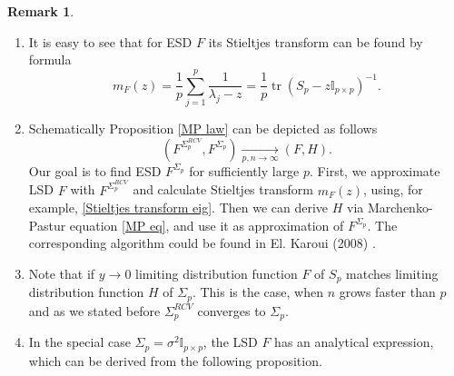 \documentclass[a4paper,11pt]{book}
\theoremstyle{plain}
\theoremstyle{definition}
\newtheorem{rmrk}[thm]{Remark}
\newcommand{\tr}{\operatorname{tr}}
\begin{document}
	\begin{rmrk} \
		\begin{enumerate}
			\item It is easy to see that for ESD $F$ its Stieltjes transform can be found by formula
			\begin{equation} \label{Stieltjes transform eig}
			m_F(z) = \frac{1}{p} \sum_{j=1}^p \frac{1}{\lambda_j - z} = \frac{1}{p} \tr(S_p-z\mathbb{I}_{p \times p})^{-1}.
			\end{equation}
			\item Schematically Proposition \ref{MP law} can be depicted as follows
			\[(F^{\Sigma_p^{RCV}}, F^{\Sigma_p}) \xrightarrow[p,n \rightarrow \infty]{} (F, H).\]
			Our goal is to find ESD $F^{\Sigma_p}$ for sufficiently large $p$. First, we approximate LSD $F$ with $F^{\Sigma_p^{RCV}}$ and calculate Stieltjes transform $m_F(z)$, using, for example, \eqref{Stieltjes transform eig}. Then we can derive $H$ via Marchenko-Pastur equation \eqref{MP eq}, and use it as approximation of $F^{\Sigma_p}$. The corresponding algorithm could be found in El. Karoui (2008) \cite{Karoui}.
			\item Note that if $y \rightarrow 0$ limiting distribution function $F$ of $S_p$ matches limiting distribution function $H$ of $\Sigma_p$. This is the case, when $n$ grows faster than $p$ and as we stated before $\Sigma_p^{RCV}$ converges to $\Sigma_p$.
			\item In the special case $\Sigma_p = \sigma^2 \mathbb{I}_{p \times p}$, the LSD $F$ has an analytical expression, which can be derived from the following proposition.
		\end{enumerate}
	\end{rmrk}
	
\end{document}
